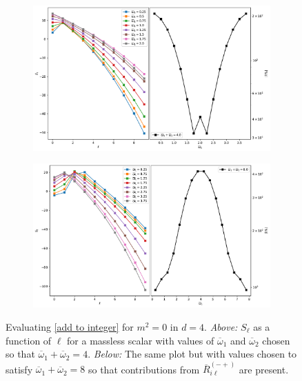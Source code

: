 \documentclass[letterpaper,11pt]{article}
\newcommand{\oone}{\overline{\omega}_1}
\newcommand{\otwo}{\overline{\omega}_2}
\begin{document}
\begin{figure}[h!]
\centering
	\begin{subfigure}[b]{0.9\textwidth}
		\includegraphics[width=\textwidth]{./figures/NNAddToInteger_source_n2_m0_0}
		\label{fig:atoi_all_n2_m0}
	\end{subfigure}
	\vspace{-0.25in}
	\begin{subfigure}[b]{0.9\textwidth}
		\includegraphics[width=\textwidth]{./figures/NNAddToInteger_source_n4_m0_0}
		\label{fig:atoi_all_n4_m0}
	\end{subfigure}
	\caption{Evaluating \eqref{add to integer} for $m^2 = 0$ in $d=4$. {\it Above:} $S_\ell$ as a function of $\ell$ for a massless scalar with values of $\oone$ and $\otwo$ chosen so that $\oone + \otwo = 4$. {\it Below:} The same plot but with values chosen to satisfy $\oone + \otwo = 8$ so that contributions from $\overline R^{(-+)}_{i\ell}$ are present.}
	\label{fig:atoi_all_m0_0compare}
\end{figure}
\end{document}
